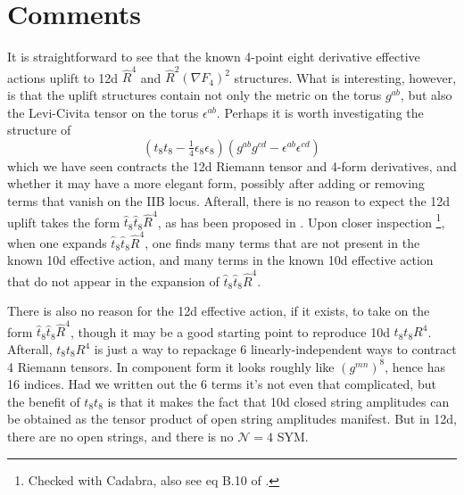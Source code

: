 \section{Comments}
It is straightforward to see that the known 4-point eight derivative effective actions uplift to 12d $\hat{R}^4$ and $\hat{R}^2 (\nabla F_4)^2$ structures.
What is interesting, however, is that the uplift structures contain not only the metric on the torus $g^{ab}$, but also the Levi-Civita tensor on the torus $\epsilon^{ab}$.
Perhaps it is worth investigating the structure of
\begin{equation}
(t_8t_8 - \tfrac14 \epsilon_8 \epsilon_8)(g^{ab}g^{cd} - \epsilon^{ab}\epsilon^{cd})
\end{equation}
which we have seen contracts the 12d Riemann tensor and 4-form derivatives, and whether it may have a more elegant form, possibly after adding or removing terms that vanish on the IIB locus.
Afterall, there is no reason to expect the 12d uplift takes the form $\hat{t}_8\hat{t}_8 \hat{R}^4$, as has been proposed in \cite{Minasian:2015bxa}.
Upon closer inspection \footnote{Checked with Cadabra, also see eq B.10 of \cite{Minasian:2015bxa}.}, when one expands $\hat{t}_8\hat{t}_8 \hat{R}^4$, one finds many terms that are not present in the known 10d effective action, and many terms in the known 10d effective action that do not appear in the expansion of $\hat{t}_8\hat{t}_8 \hat{R}^4$.

There is also no reason for the 12d effective action, if it exists, to take on the form $\hat{t}_8\hat{t}_8 \hat{R}^4$, though it may be a good starting point to reproduce 10d $t_8t_8 R^4$.
Afterall, $t_8t_8 R^4$ is just a way to repackage 6 linearly-independent ways to contract 4 Riemann tensors.
In component form it looks roughly like $(g^{mn})^8$, hence has 16 indices.
Had we written out the 6 terms it's not even that complicated, but the benefit of $t_8t_8$ is that it makes the fact that 10d closed string amplitudes can be obtained as the tensor product of open string amplitudes manifest.
But in 12d, there are no open strings, and there is no $\mathcal{N} = 4$ SYM.






